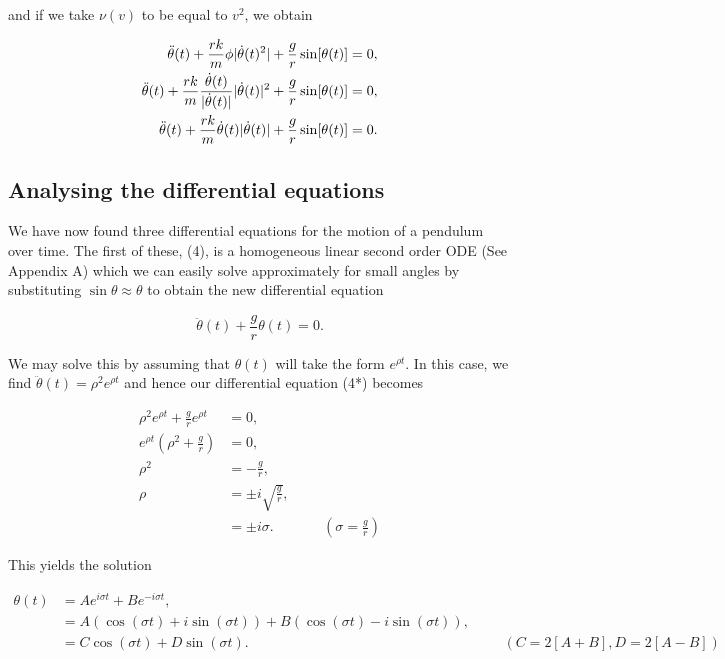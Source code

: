 \documentclass{article}
\begin{document}
and if we take $\nu(v)$ to be equal to $v^2$, we obtain

\begin{align}
	\ddot{\theta}(t) + \frac{rk}{m}\phi|\dot{\theta}(t)^2| + \frac{g}{r}\sin[\theta(t)] = 0, \notag \\
	\ddot{\theta}(t) + \frac{rk}{m}\frac{\dot{\theta}(t)}{|\dot{\theta}(t)|}|\dot{\theta}(t)|^2 + \frac{g}{r}\sin[\theta(t)] = 0, \notag \\
	\ddot{\theta}(t) + \frac{rk}{m}\dot{\theta}(t)|\dot{\theta}(t)| + \frac{g}{r}\sin[\theta(t)] = 0.
\end{align}

\subsection{Analysing the differential equations}

We have now found three differential equations for the motion of a pendulum over time. The first of these, (4), is a homogeneous linear second order ODE (See Appendix A) which we can easily solve approximately for small angles by substituting $\sin \theta \approx \theta$ to obtain the new differential equation

\begin{equation}
	\ddot{\theta}(t) + \frac{g}{r}\theta(t) = 0. \tag{4*}
\end{equation}

We may solve this by assuming that $\theta(t)$ will take the form $e^{\rho t}$. In this case, we find $\ddot{\theta}(t) = \rho^2e^{\rho t}$ and hence our differential equation (4*) becomes

\begin{align*}
	\rho^2e^{\rho t} + \frac{g}{r}e^{\rho t} &= 0, \\
	e^{\rho t}\left(\rho^2 + \frac{g}{r}\right) &= 0, \\
	\rho^2 &= -\frac{g}{r}, \\
	\rho &= \pm i \sqrt{\frac{g}{r}}, \\
	&= \pm i \sigma. &&& \left(\sigma = \frac{g}{r} \right)
\end{align*}

This yields the solution

\begin{align*}
	\theta(t) &= Ae^{i \sigma t} + Be^{-i \sigma t}, \\
	&= A\left(\cos(\sigma t) + i \sin(\sigma t)\right) + B\left(\cos(\sigma t) - i \sin(\sigma t)\right), \\
	&= C\cos(\sigma t) + D\sin(\sigma t). &&& \left(C = 2[A + B], D = 2[A - B]\right)
\end{align*}
\end{document}
